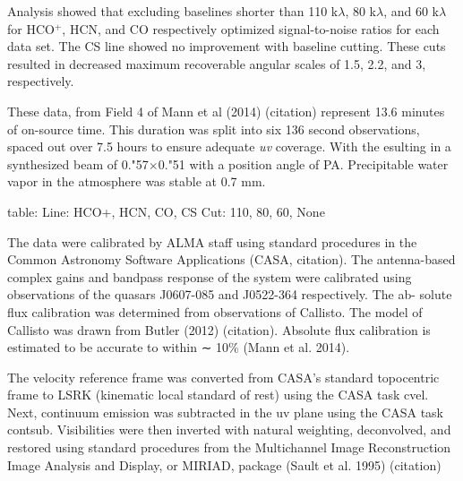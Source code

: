 Analysis showed that excluding baselines shorter than 110 k$\lambda$, 80 k$\lambda$, and 60 k$\lambda$ for HCO$^{+}$, HCN, and CO respectively optimized signal-to-noise ratios for each data set. The CS line showed no improvement with baseline cutting. These cuts resulted in decreased maximum recoverable angular scales of 1.5, 2.2, and 3, respectively.

These data, from Field 4 of Mann et al (2014) (citation) represent 13.6 minutes of on-source time. This duration was split into six 136 second observations, spaced out over 7.5 hours to ensure adequate \textit{uv} coverage. With the esulting in a synthesized beam of 0."57$\times$0."51 with a position angle of PA. Precipitable water vapor in the atmosphere was stable at 0.7 mm.


table:
Line: HCO+, HCN, CO, CS
Cut:  110,  80,  60, None



The data were calibrated by ALMA staff using standard procedures in the Common Astronomy Software Applications (CASA, citation). The antenna-based complex gains and bandpass response of the system were calibrated using observations of the quasars J0607-085 and J0522-364 respectively. The ab- solute flux calibration was determined from observations of Callisto. The model of Callisto was drawn from Butler (2012) (citation). Absolute flux calibration is estimated to be accurate to within ∼ 10\% (Mann et al. 2014).

The velocity reference frame was converted from CASA's standard topocentric frame to LSRK (kinematic local standard of rest) using the CASA task cvel. Next, continuum emission was subtracted in the uv plane using the CASA task contsub. Visibilities were then inverted with natural weighting, deconvolved, and restored using standard procedures from the Multichannel Image Reconstruction Image Analysis and Display, or MIRIAD, package (Sault et al. 1995) (citation)








\iffalse
Things to get:
* noise profiles as func of baseline
* Noise levels
* Beam size, max angular scales after baseline cuts (how to get that?)
* Beam position angle
* Does ICR use natural weighting? (using robust=2)
\fi
